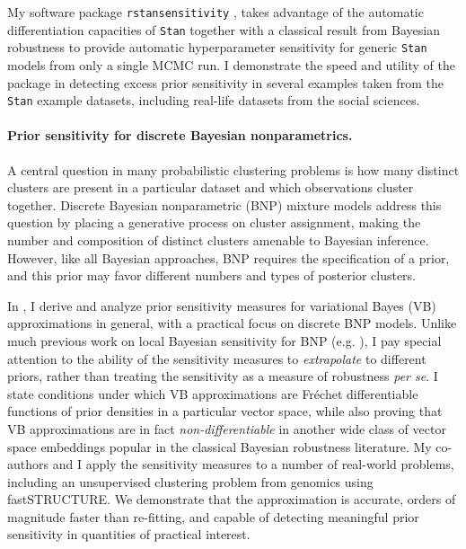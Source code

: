 My software package \texttt{rstansensitivity}
\citep{giordano:2020:rstansensitivity, giordano:2018:mcmchyper}, takes advantage
of the automatic differentiation capacities of \texttt{Stan} together with a
classical result from  Bayesian robustness \citep{gustafson:1996:localposterior,
giordano:2018:covariances} to provide automatic hyperparameter sensitivity for
generic \texttt{Stan} models from only a single MCMC run.  I demonstrate the
speed and utility of the package in detecting excess prior sensitivity in
several examples taken from the \texttt{Stan} example datasets,
including real-life datasets from the social sciences.



\paragraph{Prior sensitivity for discrete Bayesian nonparametrics.}
%
A central question in many probabilistic clustering problems is how many
distinct clusters are present in a particular dataset and which observations
cluster together. Discrete Bayesian nonparametric (BNP) mixture models address
this question by placing a generative process on cluster assignment, making the
number and composition of distinct clusters amenable to Bayesian inference.
However, like all Bayesian approaches, BNP requires the specification of a
prior, and this prior may favor different numbers and types of posterior
clusters.

In \citet{giordano:2021:bnpsensitivity}, I derive and analyze prior sensitivity
measures for variational Bayes (VB) approximations in general, with a practical
focus on discrete BNP models. Unlike much previous work on local Bayesian
sensitivity for BNP (e.g. \citet{Basu:2000:BNP_robustness}), I pay special
attention to the ability of the sensitivity measures to \emph{extrapolate} to
different priors, rather than treating the sensitivity as a measure of
robustness \textit{per se}.  I state conditions under which VB approximations
are Fr{\'e}chet differentiable functions of prior densities in a particular
vector space, while also proving that VB approximations are in fact
\emph{non-differentiable} in another wide class of vector space embeddings
popular in the classical Bayesian robustness literature.
My co-authors and I apply the sensitivity measures to a number of real-world
problems, including an unsupervised clustering problem from genomics using
fastSTRUCTURE.  We demonstrate that the approximation is accurate, orders of
magnitude faster than re-fitting, and capable of detecting meaningful prior
sensitivity in quantities of practical interest.

